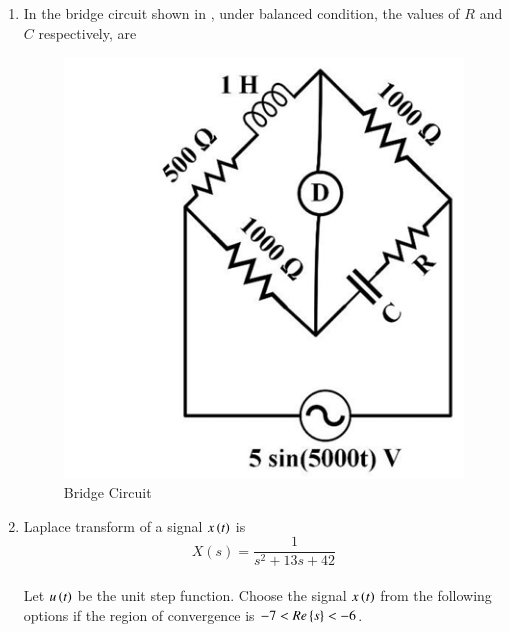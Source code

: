 \documentclass[journal,12pt,onecolumn]{IEEEtran}
\theoremstyle{remark}
\begin{document}
\begin{enumerate}
\item In the bridge circuit shown in , under balanced condition, the values of $R$ and $C$ respectively, are
\par\hfill{}
\begin{figure}[H]
    \centering
    \includegraphics[width=0.3\columnwidth]{Figs/Q-39.png}
    \caption{Bridge Circuit}
    \label{39}
\end{figure}
    \begin{enumerate}
    \end{enumerate}

\item Laplace transform of a signal $x\brak{t}$ is $$X(s) = \frac{1}{s^2 + 13s + 42}$$\\
Let $u\brak{t}$ be the unit step function. Choose the signal $x\brak{t}$ from the following options if the region of convergence is $-7 < Re\cbrak{s} < -6$.
\par\hfill{}
    \begin{enumerate}
    \end{enumerate}



\end{enumerate}
\end{document}
